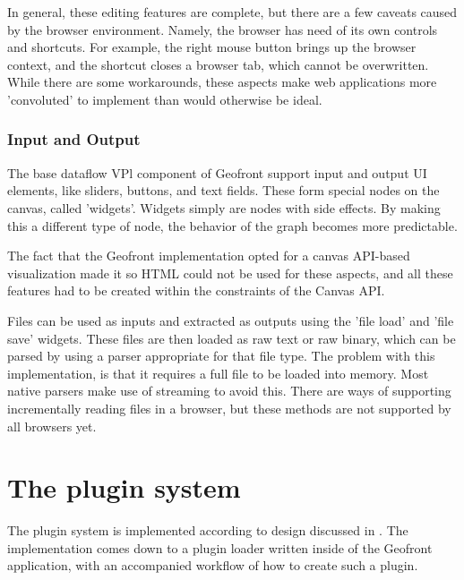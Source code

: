 In general, these editing features are complete, but there are a few caveats caused by the browser environment.
Namely, the browser has need of its own controls and shortcuts. 
For example, the right mouse button brings up the browser context, and the  shortcut closes a browser tab, which cannot be overwritten.
While there are some workarounds, these aspects make web applications more 'convoluted' to implement than would otherwise be ideal.

\subsubsection*{Input and Output}
The base dataflow VPl component of Geofront support input and output UI elements, like sliders, buttons, and text fields.
These form special nodes on the canvas, called 'widgets'. 
Widgets simply are nodes with side effects. 
By making this a different type of node, the behavior of the graph becomes more predictable.

The fact that the Geofront implementation opted for a canvas API-based visualization made it so HTML could not be used for these aspects, and all these features had to be created within the constraints of the Canvas API.

Files can be used as inputs and extracted as outputs using the 'file load' and 'file save' widgets. 
These files are then loaded as raw text or raw binary, which can be parsed by using a parser appropriate for that file type. 
The problem with this implementation, is that it requires a full file to be loaded into memory. 
Most native parsers make use of streaming to avoid this. 
There are ways of supporting incrementally reading files in a browser, but these methods are not supported by all browsers yet. 



\newpage
\section{The plugin system}
\label{sec:implementation:loading}

The plugin system is implemented according to design discussed in .
The implementation comes down to a plugin loader written inside of the Geofront application, with an accompanied workflow of how to create such a plugin. 

